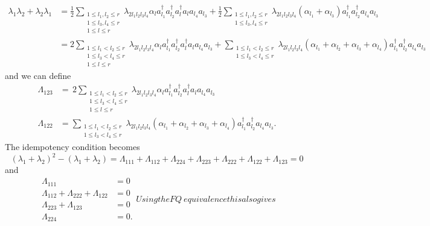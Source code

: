 \documentclass[aps,preprint]{revtex4}%
\begin{document}
\begin{align}
\lambda_{1}\lambda_{2}+\lambda_{2}\lambda_{1}  &  =\frac{1}{2}\sum
_{\substack{1\leq l_{1},l_{2}\leq r\\1\leq l_{3},l_{4}\leq r\\1\leq l\leq
r}}\lambda_{2l_{1}l_{2}l_{3}l_{4}}\alpha_{l}a_{l_{1}}^{\dagger}a_{l_{2}%
}^{\dagger}a_{l}^{\dagger}a_{l}a_{l_{4}}a_{l_{3}}+\frac{1}{2}\sum
_{\substack{1\leq l_{1},l_{2}\leq r\\1\leq l_{3},l_{4}\leq r}}\lambda
_{2l_{1}l_{2}l_{3}l_{4}}\left(  \alpha_{l_{1}}+\alpha_{l_{3}}\right)
a_{l_{1}}^{\dagger}a_{l_{2}}^{\dagger}a_{l_{4}}a_{l_{3}}\nonumber\\
&  =2\sum_{\substack{1\leq l_{1}<l_{2}\leq r\\1\leq l_{3}<l_{4}\leq r\\1\leq
l\leq r}}\lambda_{2l_{1}l_{2}l_{3}l_{4}}\alpha_{l}a_{l_{1}}^{\dagger}a_{l_{2}%
}^{\dagger}a_{l}^{\dagger}a_{l}a_{l_{4}}a_{l_{3}}+\sum_{\substack{1\leq
l_{1}<l_{2}\leq r\\1\leq l_{3}<l_{4}\leq r}}\lambda_{2l_{1}l_{2}l_{3}l_{4}%
}\left(  \alpha_{l_{1}}+\alpha_{l_{2}}+\alpha_{l_{3}}+\alpha_{l_{4}}\right)
a_{l_{1}}^{\dagger}a_{l_{2}}^{\dagger}a_{l_{4}}a_{l_{3}}%
\end{align}
and we can define
\begin{align}
\Lambda_{123}  &  =\,2\sum_{\substack{1\leq l_{1}<l_{2}\leq r\\1\leq
l_{3}<l_{4}\leq r\\1\leq l\leq r}}\lambda_{2l_{1}l_{2}l_{3}l_{4}}\alpha
_{l}a_{l_{1}}^{\dagger}a_{l_{2}}^{\dagger}a_{l}^{\dagger}a_{l}a_{l_{4}%
}a_{l_{3}}\\
\Lambda_{122}  &  =\sum_{\substack{1\leq l_{1}<l_{2}\leq r\\1\leq l_{3}%
<l_{4}\leq r}}\lambda_{2l_{1}l_{2}l_{3}l_{4}}\left(  \alpha_{l_{1}}%
+\alpha_{l_{2}}+\alpha_{l_{3}}+\alpha_{l_{4}}\right)  a_{l_{1}}^{\dagger
}a_{l_{2}}^{\dagger}a_{l_{4}}a_{l_{3}}.
\end{align}
The idempotency condition becomes
\[
\left(  \lambda_{1}+\lambda_{2}\right)  ^{2}-\left(  \lambda_{1}+\lambda
_{2}\right)  =\Lambda_{111}+\Lambda_{112}+\Lambda_{224}+\Lambda_{223}%
+\Lambda_{222}+\Lambda_{122}+\Lambda_{123}=0
\]
and
\begin{subequations}
\begin{align}
\Lambda_{111}  &  =0\\
\Lambda_{112}+\Lambda_{222}+\Lambda_{122}  &  =0\\
\Lambda_{223}+\Lambda_{123}  &  =0\\
\Lambda_{224}  &  =0.
\end{align}
Using the FQ\ equivalence this also gives
\end{subequations}
\end{document}
